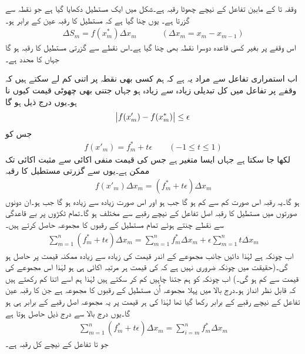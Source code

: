 وقفہ  تا  کے مابین تفاعل کے نیچے  چھوٹا رقبہ  ہے۔شکل  میں ایک مستطیل دکھایا گیا ہے جو نقطہ  سے گزرتا ہے۔ یوں چنا گیا ہے کہ مستطیل کا رقبہ عین   کے برابر ہو۔
\begin{align*}
\Delta S_m=f(x^*_{m})\Delta x_m\quad \quad  \quad (\Delta x_m=x_{m}-x_{m-1})
\end{align*}
 اس وقفے پر بغیر کسی قاعدہ دوسرا نقطہ  بھی چنا گیا ہے۔اس نقطے سے گزرتی مستطیل کا رقبہ  ہو گا جہاں  کا  محدد  ہے۔


اب استمراری تفاعل سے مراد یہ ہے کہ ہم کسی بھی  نقطہ  پر    اتنی کم لے سکتے ہیں کہ  وقفے پر تفاعل میں کل تبدیلی زیادہ سے زیادہ   ہو جہاں  جتنی بھی  چھوٹی قیمت کیوں نا ہو۔یوں  درج ذیل ہو گا
\begin{align*}
\abs{f(x'_m)-f(x^*_m)}\le \epsilon
\end{align*}
جس کو 
\begin{align*}
f(x'_m)=f^*_m+t\epsilon \quad \quad (-1\le t \le 1)
\end{align*}
لکھا جا سکتا ہے جہاں  ایسا متغیر ہے جس کی قیمت منفی اکائی سے مثبت اکائی تک ممکن ہے۔یوں  سے گزرتی مستطیل کا رقبہ
\begin{align*}
f(x'_m)\Delta x_m=(f^*_m+t\epsilon)\Delta x_m
\end{align*}
ہو گا۔یہ رقبہ اس صورت کم سے کم ہو گا جب  ہو اور اس صورت زیادہ سے زیادہ ہو گا جب  ہو۔ان دونوں صورتوں میں مستطیل کا رقبہ اصل تفاعل کے نیچے  رقبے سے  مختلف ہو گا۔تمام ٹکڑوں پر بے قاعدگی سے نقطے چنتے ہوئے تمام  مستطیل کے رقبوں کا مجموعہ حاصل کرتے ہیں۔
\begin{align*}
\sum_{m=1}^{n}(f^*_m+t\epsilon)\Delta x_m=\sum_{m=1}^{n} f^*_m\Delta x_m+\epsilon\sum_{m=1}^{n}  t\Delta x_m
\end{align*}
اب چونکہ  ہے لہٰذا دائیں جانب مجموعے کے اندر قیمت کی زیادہ سے زیادہ ممکنہ قیمت  پر  حاصل ہو گی۔(حقیقت میں چونکہ ضروری نہیں ہے کہ  کی قیمت ہر مرتبہ اکائی ہی ہو لہٰذا اس مجموعے کی قیمت  سے کم ہو گی۔) اب چونکہ  کو ہم جتنا چاہیں کم کر سکتے ہیں لہٰذا ہم اسے اتنا کم رکھتے ہیں کہ  قابل نظر انداز ہو۔درج بالا میں پہلا مجموعہ اُن مستطیل کے رقبوں کا مجموعہ ہے جن کا رقبہ عین تفاعل کے نیچے رقبے  کے برابر رکھا گیا تھا لہٰذا  کی ہر قیمت پر یہ مجموعہ اصل رقبے کے برابر ہی ہو گا۔یوں درج بالا سے درج ذیل حاصل ہوتا ہے
\begin{align*}
\sum_{m=1}^{n}(f^*_m+t\epsilon)\Delta x_m=\sum_{i=m}^{n} f^*_m\Delta x_m
\end{align*}
جو  تا  تفاعل کے نیچے کل رقبہ ہے۔

